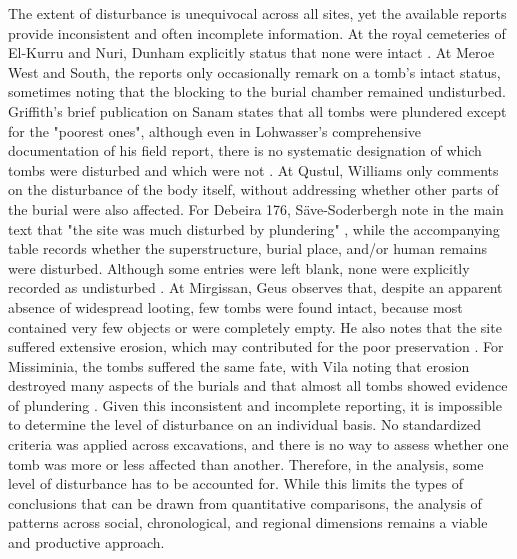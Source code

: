 The extent of disturbance is unequivocal across all sites, yet the available reports provide inconsistent and often incomplete information. At the royal cemeteries of El-Kurru and Nuri, Dunham explicitly status that none were intact \parencites[p.~12]{dunhamElKurru1950}[p.~4]{dunhamNuri1955}. At Meroe West and South, the reports only occasionally remark on a tomb's intact status, sometimes noting that the blocking to the burial chamber remained undisturbed. Griffith's brief publication on Sanam states that all tombs were plundered except for the "poorest ones", although even in Lohwasser's comprehensive documentation of his field report, there is no systematic designation of which tombs were disturbed and which were not \parencites[p.~75]{griffithOxfordExcavationsNubia1923}[p.~423-509]{lohwasserAspekteNapatanischenGesellschaft2012}. At Qustul, Williams only comments on the disturbance of the body itself, without addressing whether other parts of the burial were also affected. For Debeira 176, Säve-Soderbergh note in the main text that "the site was much disturbed by plundering" \parencite[p.~200]{säve-söderberghScandinavianJointExpedition1989}, while the accompanying table records whether the superstructure, burial place, and/or human remains were disturbed. Although some entries were left blank, none were explicitly recorded as undisturbed \parencite[p.~36-38]{säve-söderberghScandinavianJointExpedition1989a}. At Mirgissan, Geus observes that, despite an apparent absence of widespread looting, few tombs were found intact, because most contained very few objects or were completely empty. He also notes that the site suffered extensive erosion, which may contributed for the poor preservation \parencite[p.~479]{geusCimetièreXXVèmeDynastie1975}. For Missiminia, the tombs suffered the same fate, with Vila noting that erosion destroyed many aspects of the burials and that almost all tombs showed evidence of plundering \parencite[p.~11, 26-29, 32]{vilaNécropoleMissiminiaSépultures1980}. Given this inconsistent and incomplete reporting, it is impossible to determine the level of disturbance on an individual basis. No standardized criteria was applied across excavations, and there is no way to assess whether one tomb was more or less affected than another. Therefore, in the analysis, some level of disturbance has to be accounted for. While this limits the types of conclusions that can be drawn from quantitative comparisons, the analysis of patterns across social, chronological, and regional dimensions remains a viable and productive approach.


